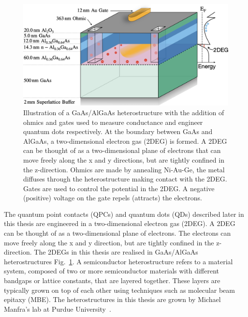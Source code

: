\begin{figure}[!htb]
 \begin{center}
  \includegraphics[width=1.0\textwidth]{figures/ch1/crop_FiguresMaster.002.png}
  \caption[Two dimensional electron gas in a GaAs/AlGaAs heterostructure]{\label{fig:ch1/2deg} 
  Illustration of a GaAs/AlGaAs heterostructure with the addition of ohmics and gates used to measure conductance and engineer quantum dots respectively. At the boundary between GaAs and AlGaAs, a two-dimensional electron gas (2DEG) is formed. A 2DEG can be thought of as a two-dimensional plane of electrons that can move freely along the x and y directions, but are tightly confined in the z-direction. Ohmics are made by annealing Ni-Au-Ge, the metal diffuses through the heterostructure making contact with the 2DEG. Gates are used to control the potential in the 2DEG. A negative (positive) voltage on the gate repels (attracts) the electrons.
   }
 \end{center}
\end{figure}



The quantum point contacts (QPCs) and quantum dots (QDs) described later in this thesis are engineered in a two-dimensional electron gas (2DEG). A 2DEG can be thought of as a two-dimensional plane of electrons. The electrons can move freely along the x and y direction, but are tightly confined in the z-direction. The 2DEGs in this thesis are realised in GaAs/AlGaAs heterostructures Fig.~\ref{fig:ch1/2deg}. A semiconductor heterostructure refers to a material system, composed of two or more semiconductor materials with different bandgaps or lattice constants, that are layered together. These layers are typically grown on top of each other using techniques such as molecular beam epitaxy (MBE). The heterostructures in this thesis are grown by Michael Manfra's lab at Purdue University~\cite{manfra_high_quality}. 

